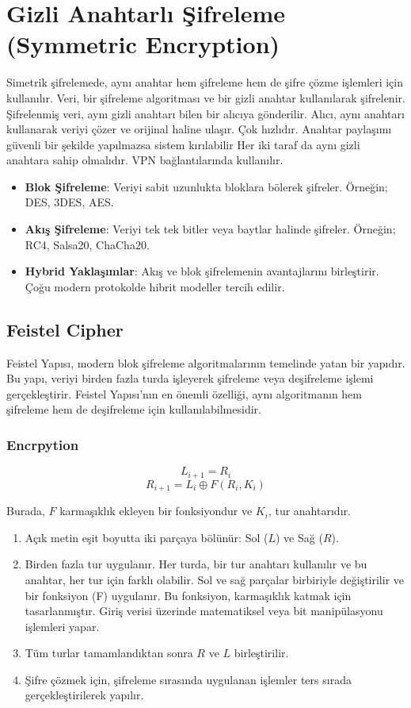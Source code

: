 \section{Gizli Anahtarlı Şifreleme (Symmetric Encryption)}

Simetrik şifrelemede, aynı anahtar hem şifreleme hem de şifre çözme işlemleri için kullanılır. Veri, bir şifreleme algoritması ve bir gizli anahtar kullanılarak şifrelenir. Şifrelenmiş veri, aynı gizli anahtarı bilen bir alıcıya gönderilir. Alıcı, aynı anahtarı kullanarak veriyi çözer ve orijinal haline ulaşır. Çok hızlıdır. Anahtar paylaşımı güvenli bir şekilde yapılmazsa sistem kırılabilir Her iki taraf da aynı gizli anahtara sahip olmalıdır. VPN bağlantılarında kullanılır. 

\begin{itemize}
    \item \textbf{Blok Şifreleme}: Veriyi sabit uzunlukta bloklara bölerek şifreler. Örneğin; DES, 3DES, AES.
    \item \textbf{Akış Şifreleme}: Veriyi tek tek bitler veya baytlar halinde şifreler. Örneğin; RC4, Salsa20, ChaCha20.
    \item \textbf{Hybrid Yaklaşımlar}: Akış ve blok şifrelemenin avantajlarını birleştirir. Çoğu modern protokolde hibrit modeller tercih edilir.
\end{itemize}

\subsection{Feistel Cipher}

Feistel Yapısı, modern blok şifreleme algoritmalarının temelinde yatan bir yapıdır. Bu yapı, veriyi birden fazla turda işleyerek şifreleme veya deşifreleme işlemi gerçekleştirir. Feistel Yapısı'nın en önemli özelliği, aynı algoritmanın hem şifreleme hem de deşifreleme için kullanılabilmesidir. 

\subsubsection{Encrpytion}

\[ L_{i + 1} = R_i \]
\[ R_{i + 1} = L_i \oplus F(R_i, K_i) \]

Burada, $F$ karmaşıklık ekleyen bir fonksiyondur ve $K_i$, tur anahtarıdır.

\begin{enumerate}
    \item Açık metin eşit boyutta iki parçaya bölünür: Sol ($L$) ve Sağ ($R$).
    \item Birden fazla tur uygulanır. Her turda, bir tur anahtarı kullanılır ve bu anahtar, her tur için farklı olabilir. Sol ve sağ parçalar birbiriyle değiştirilir ve bir fonksiyon (F) uygulanır. Bu fonksiyon, karmaşıklık katmak için tasarlanmıştır. Giriş verisi üzerinde matematiksel veya bit manipülasyonu işlemleri yapar.
    \item Tüm turlar tamamlandıktan sonra $R$ ve $L$ birleştirilir.
    \item Şifre çözmek için, şifreleme sırasında uygulanan işlemler ters sırada gerçekleştirilerek yapılır.
\end{enumerate}

